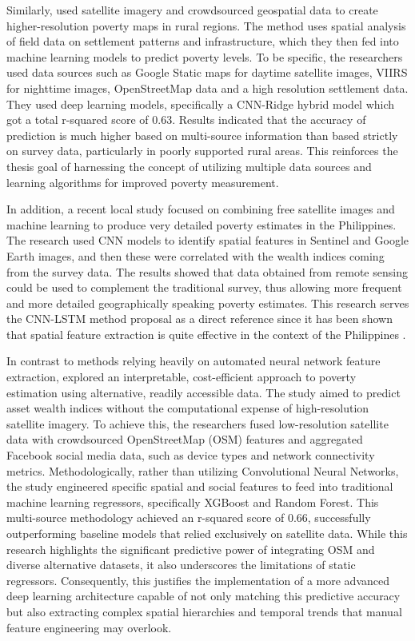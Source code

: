 \documentclass[12pt, letterpaper]{article}
\numberwithin{figure}{section}
\numberwithin{table}{section}
\begin{document}
Similarly, \textcite{Tingzon2019}  used satellite imagery and
crowdsourced geospatial data to create higher-resolution poverty maps
in rural regions. The method uses spatial analysis of field data on
settlement patterns and infrastructure, which they then fed into
machine learning models to predict poverty levels. To be specific,
the researchers used data sources such as Google Static maps for
daytime satellite images, VIIRS for nighttime images, OpenStreetMap
data and a high resolution settlement data. They used deep learning
models, specifically a CNN-Ridge hybrid model which got a total
r-squared score of 0.63. Results indicated that the accuracy of
prediction is much higher based on multi-source information than
based strictly on survey data, particularly in poorly supported rural
areas. This reinforces the thesis goal of harnessing the concept of
utilizing multiple data sources and learning algorithms for improved
poverty measurement.

In addition, a recent local  study focused on combining free
satellite images and machine learning to produce very detailed
poverty estimates in the Philippines. The research used CNN models to
identify spatial features in Sentinel and Google Earth images, and
then these were correlated with the wealth indices coming from the
survey data. The results showed that data obtained from remote
sensing could be used to complement the traditional survey, thus
allowing more frequent and more detailed geographically speaking
poverty estimates. This research serves the CNN-LSTM method proposal
as a direct reference since it has been shown that spatial feature
extraction is quite effective in the context of the Philippines
\parencite{Jimenez2025}.

In contrast to methods relying heavily on automated neural network
feature extraction, \textcite{Ledesma2020} explored an interpretable,
cost-efficient approach to poverty estimation using alternative,
readily accessible data. The study aimed to predict asset wealth
indices without the computational expense of high-resolution
satellite imagery. To achieve this, the researchers fused
low-resolution satellite data with crowdsourced OpenStreetMap (OSM)
features and aggregated Facebook social media data, such as device
types and network connectivity metrics. Methodologically, rather than
utilizing Convolutional Neural Networks, the study engineered
specific spatial and social features to feed into traditional machine
learning regressors, specifically XGBoost and Random Forest. This
multi-source methodology achieved an r-squared score of 0.66,
successfully outperforming baseline models that relied exclusively on
satellite data. While this research highlights the significant
predictive power of integrating OSM and diverse alternative datasets,
it also underscores the limitations of static regressors.
Consequently, this justifies the implementation of a more advanced
deep learning architecture capable of not only matching this
predictive accuracy but also extracting complex spatial hierarchies
and temporal trends that manual feature engineering may overlook.
\end{document}
